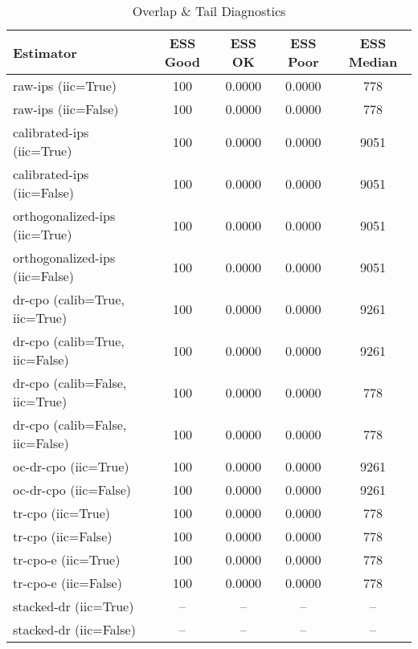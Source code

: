 \begin{table}[htbp]
\centering
\caption{Overlap & Tail Diagnostics}
\label{tab:A3}
\begin{tabular}{l|cccc}
\toprule
Estimator & ESS Good & ESS OK & ESS Poor & ESS Median \\
\midrule
raw-ips (iic=True) & 100 & 0.0000 & 0.0000 & 778 \\
raw-ips (iic=False) & 100 & 0.0000 & 0.0000 & 778 \\
calibrated-ips (iic=True) & 100 & 0.0000 & 0.0000 & 9051 \\
calibrated-ips (iic=False) & 100 & 0.0000 & 0.0000 & 9051 \\
orthogonalized-ips (iic=True) & 100 & 0.0000 & 0.0000 & 9051 \\
orthogonalized-ips (iic=False) & 100 & 0.0000 & 0.0000 & 9051 \\
dr-cpo (calib=True, iic=True) & 100 & 0.0000 & 0.0000 & 9261 \\
dr-cpo (calib=True, iic=False) & 100 & 0.0000 & 0.0000 & 9261 \\
dr-cpo (calib=False, iic=True) & 100 & 0.0000 & 0.0000 & 778 \\
dr-cpo (calib=False, iic=False) & 100 & 0.0000 & 0.0000 & 778 \\
oc-dr-cpo (iic=True) & 100 & 0.0000 & 0.0000 & 9261 \\
oc-dr-cpo (iic=False) & 100 & 0.0000 & 0.0000 & 9261 \\
tr-cpo (iic=True) & 100 & 0.0000 & 0.0000 & 778 \\
tr-cpo (iic=False) & 100 & 0.0000 & 0.0000 & 778 \\
tr-cpo-e (iic=True) & 100 & 0.0000 & 0.0000 & 778 \\
tr-cpo-e (iic=False) & 100 & 0.0000 & 0.0000 & 778 \\
stacked-dr (iic=True) & -- & -- & -- & -- \\
stacked-dr (iic=False) & -- & -- & -- & -- \\
\bottomrule
\end{tabular}
\end{table}